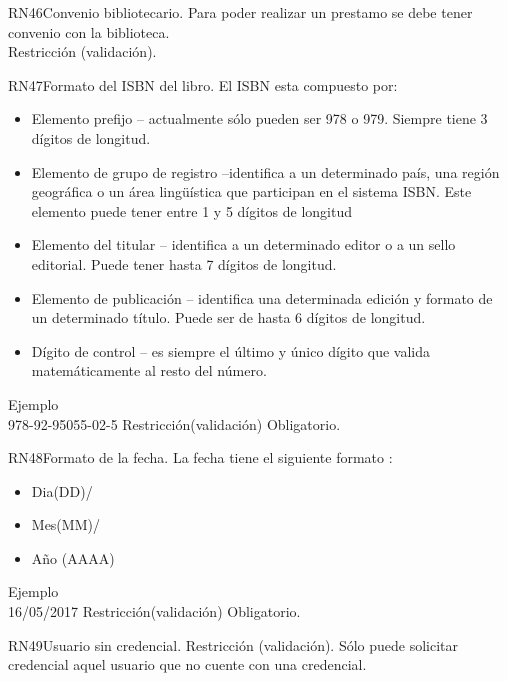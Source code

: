 \begin{BussinesRule}{RN46}{Convenio bibliotecario.} 
	\BRitem[Descripción:] Para poder realizar un prestamo se debe tener convenio con la biblioteca.\\
	\BRitem[Tipo:] Restricción (validación).
\end{BussinesRule}

\begin{BussinesRule}{RN47}{Formato del ISBN del libro.}
	\BRitem[Descripción:] El ISBN esta compuesto por:
		\begin{itemize} 
			\item Elemento prefijo – actualmente sólo pueden ser 978 o 979. Siempre tiene 3 dígitos de longitud.
			\item Elemento de grupo de registro –identifica a un determinado país, una región geográfica o un área lingüística que participan en el sistema ISBN. Este elemento puede tener entre 1 y 5 dígitos de longitud
			\item Elemento del titular – identifica a un determinado editor o a un sello editorial. Puede tener hasta 7 dígitos de longitud. 
			\item Elemento de publicación – identifica una determinada edición y formato de un determinado título. Puede ser de hasta 6 dígitos de longitud. 
			\item Dígito de control – es siempre el último y único dígito que valida matemáticamente al resto del número. 
		\end{itemize}
Ejemplo \\
	978-92-95055-02-5
	\BRitem[Tipo:] Restricción(validación)
	\BRitem[Nivel:] Obligatorio.
\end{BussinesRule}


\begin{BussinesRule}{RN48}{Formato de la fecha.}
	\BRitem[Descripción:] La fecha tiene el siguiente formato :
		\begin{itemize} 
			\item Dia(DD)/ 
			\item Mes(MM)/
			\item Año (AAAA)
		\end{itemize}
Ejemplo \\
	16/05/2017
	\BRitem[Tipo:] Restricción(validación)
	\BRitem[Nivel:] Obligatorio.
\end{BussinesRule}

\begin{BussinesRule}{RN49}{Usuario sin credencial.}
	\BRitem[Tipo:] Restricción (validación).
	\BRitem[Descripción:] Sólo puede solicitar credencial aquel usuario que no cuente con una credencial.
\end{BussinesRule}

